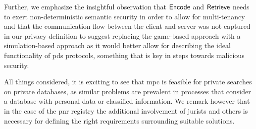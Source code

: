 Further, we emphasize the insightful observation that $ \mathsf{{Encode}} $ and $ \mathsf{{Retrieve}} $ needs to exert non-deterministic semantic security in order to allow for multi-tenancy and that the communication flow between the client and server was not captured in our privacy definition to suggest replacing the game-based approach with a simulation-based approach as it would better allow for describing the ideal functionality of \acrshort{pds} protocols, something that is key in steps towards malicious security.

All things considered, it is exciting to see that \acrshort{mpc} is feasible for private searches on private databases, as similar problems are prevalent in processes that consider a database with personal data or classified information. We remark however that in the case of the \acrshort{pnr} registry the additional involvement of jurists and others is necessary for defining the right requirements surrounding suitable solutions.
